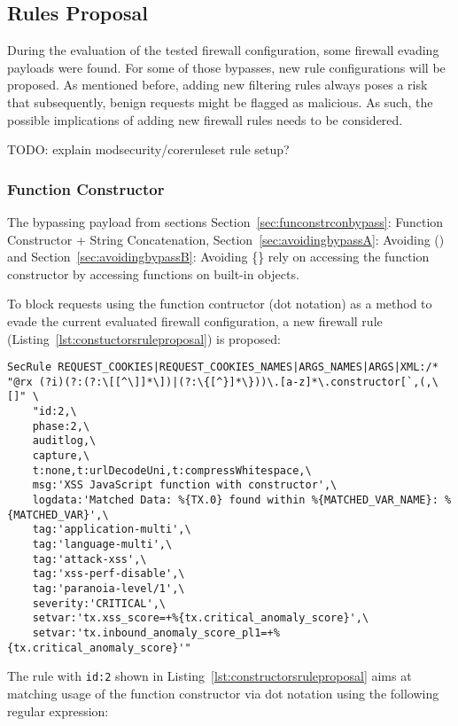 \subsection{Rules Proposal}
\label{sec:rulesproposal}
During the evaluation of the tested firewall configuration, some firewall evading payloads were found. For some of those bypasses, new rule configurations will be proposed. As mentioned before, adding new filtering rules always poses a risk that subsequently, benign requests might be flagged as malicious. As such, the possible implications of adding new firewall rules needs to be considered.

	{\color{red} TODO: explain modsecurity/coreruleset rule setup?}

\subsubsection{Function Constructor}
\label{sec:rulespropfunctionconstructor}
The bypassing payload from sections Section~\ref{sec:funconstrconbypass}: Function Constructor + String Concatenation, Section~\ref{sec:avoidingbypassA}: Avoiding () and Section~\ref{sec:avoidingbypassB}: Avoiding \{\} rely on accessing the function constructor by accessing functions on built-in objects.

To block requests using the function contructor (dot notation) as a method to evade the current evaluated firewall configuration, a new firewall rule (Listing~\ref{lst:constuctorsruleproposal}) is proposed:

\begin{lstlisting}[style=basicStyle, caption=rule proposal to block usage of function constructor via dot notation, label={lst:constructorsruleproposal}]
SecRule REQUEST_COOKIES|REQUEST_COOKIES_NAMES|ARGS_NAMES|ARGS|XML:/* "@rx (?i)(?:(?:\[[^\]]*\])|(?:\{[^}]*\}))\.[a-z]*\.constructor[`,(,\[]" \
    "id:2,\
    phase:2,\
    auditlog,\
    capture,\
    t:none,t:urlDecodeUni,t:compressWhitespace,\
    msg:'XSS JavaScript function with constructor',\
    logdata:'Matched Data: %{TX.0} found within %{MATCHED_VAR_NAME}: %{MATCHED_VAR}',\
    tag:'application-multi',\
    tag:'language-multi',\
    tag:'attack-xss',\
    tag:'xss-perf-disable',\
    tag:'paranoia-level/1',\
    severity:'CRITICAL',\
    setvar:'tx.xss_score=+%{tx.critical_anomaly_score}',\
    setvar:'tx.inbound_anomaly_score_pl1=+%{tx.critical_anomaly_score}'"
\end{lstlisting}

The rule with \verb|id:2| shown in Listing~\ref{lst:constructorsruleproposal} aims at matching usage of the function constructor via dot notation using the following regular expression:


